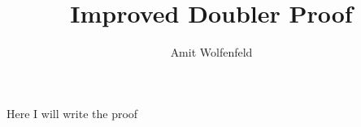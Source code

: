 \documentclass[10pt,a4paper]{article}
\author{Amit Wolfenfeld}
\title{Improved Doubler Proof}
\begin{document}
Here I will write the proof
\end{document}
